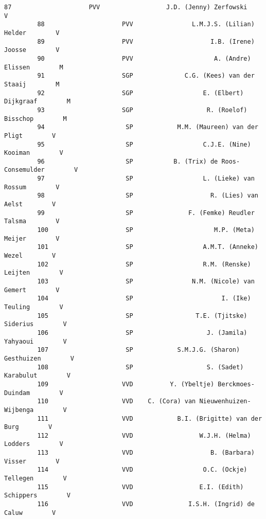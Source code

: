 \documentclass{article}
\begin{document}
\begin{Verbatim}[commandchars=\\\{\}]
         87                     PVV                  J.D. (Jenny) Zerfowski        V   
         88                     PVV                L.M.J.S. (Lilian) Helder        V   
         89                     PVV                     I.B. (Irene) Joosse        V   
         90                     PVV                      A. (Andre) Elissen        M   
         91                     SGP              C.G. (Kees) van der Staaij        M   
         92                     SGP                   E. (Elbert) Dijkgraaf        M   
         93                     SGP                    R. (Roelof) Bisschop        M   
         94                      SP            M.M. (Maureen) van der Pligt        V   
         95                      SP                   C.J.E. (Nine) Kooiman        V   
         96                      SP           B. (Trix) de Roos-Consemulder        V   
         97                      SP                   L. (Lieke) van Rossum        V   
         98                      SP                     R. (Lies) van Aelst        V   
         99                      SP               F. (Femke) Reudler Talsma        V   
         100                     SP                      M.P. (Meta) Meijer        V   
         101                     SP                   A.M.T. (Anneke) Wezel        V   
         102                     SP                   R.M. (Renske) Leijten        V   
         103                     SP                N.M. (Nicole) van Gemert        V   
         104                     SP                        I. (Ike) Teuling        V   
         105                     SP                 T.E. (Tjitske) Siderius        V   
         106                     SP                    J. (Jamila) Yahyaoui        V   
         107                     SP            S.M.J.G. (Sharon) Gesthuizen        V   
         108                     SP                    S. (Sadet) Karabulut        V   
         109                    VVD          Y. (Ybeltje) Berckmoes-Duindam        V   
         110                    VVD    C. (Cora) van Nieuwenhuizen-Wijbenga        V   
         111                    VVD            B.I. (Brigitte) van der Burg        V   
         112                    VVD                  W.J.H. (Helma) Lodders        V   
         113                    VVD                     B. (Barbara) Visser        V   
         114                    VVD                   O.C. (Ockje) Tellegen        V   
         115                    VVD                  E.I. (Edith) Schippers        V   
         116                    VVD               I.S.H. (Ingrid) de Caluw        V   

\end{Verbatim}
\end{document}

